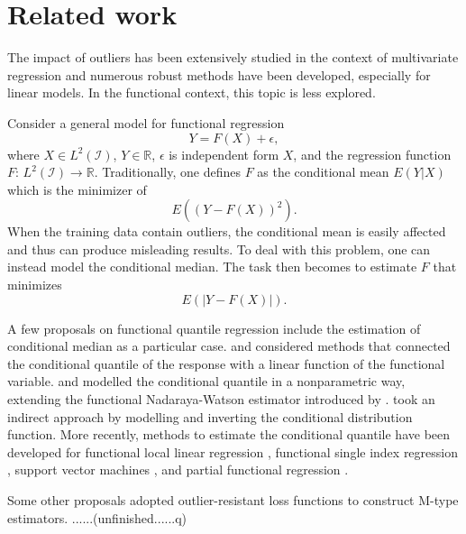 \documentclass{article}
\begin{document}




\section{Related work}
The impact of outliers has been extensively studied in the context of multivariate regression and numerous robust methods have been developed, especially for linear models.  In the functional context, this topic is less explored.  

Consider a general  model for functional regression
\begin{equation}\label{eq:general}
Y = 	F(X) + \epsilon, 
\end{equation}
where $X \in L^2 (\mathcal{I})$, $Y \in \mathbb{R}$, $\epsilon$ is independent form $X$, and the regression function  $F$: $L^2 (\mathcal{I}) \rightarrow \mathbb{R}$. Traditionally, one defines $F$ as  the conditional mean $E(Y|X)$ which is the minimizer of 
$$E( (Y - F(X) )^2).$$
When the training data contain outliers, the conditional mean is  easily affected and thus can produce misleading results. To deal with this problem, one can instead model the conditional median.  The task then becomes to estimate $F$ that minimizes 
$$E( |Y - F(X)|).$$

A few proposals on functional quantile regression 
include the estimation of conditional median as a particular case. \cite{cardot2005quantile} and  \cite{kato2012estimation} considered methods that connected the conditional quantile of the response with a linear function of the functional variable. \cite{ferraty2005conditional} and \cite{crambes2008robust}  modelled the conditional quantile in a nonparametric way,  extending the functional Nadaraya-Watson estimator introduced by \cite{ferraty2002functional}.  \cite{chen2012conditional} took an indirect approach by modelling and inverting the  conditional distribution function. More recently, methods to estimate the conditional quantile have been developed for functional local linear regression \citep{kaid2017functional,al2019functional}, functional single index regression \citep{sang2020functional}, support vector machines \citep{crambes2013support}, and partial functional regression \citep{qingguo2017quantile}.  

Some other proposals adopted outlier-resistant loss functions to construct M-type estimators. ......(unfinished......q)
\end{document}
